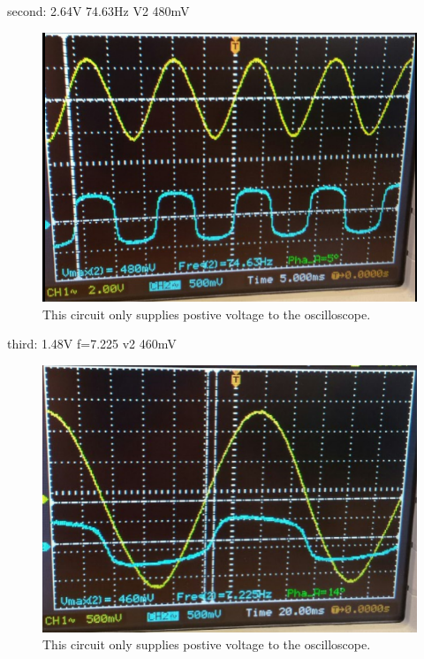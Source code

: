 \documentclass[twocolumn, amsmath]{revtex4}
\begin{document}
second: 2.64V  74.63Hz
V2 480mV

\begin{figure}
    \includegraphics[scale=0.3]{480mV.png}  
    \caption{This circuit only supplies postive voltage to the oscilloscope.}
\end{figure}

third: 1.48V f=7.225
v2 460mV

\begin{figure}
    \includegraphics[scale=0.3]{460mV.png}  
    \caption{This circuit only supplies postive voltage to the oscilloscope.}
\end{figure}




\end{document}
